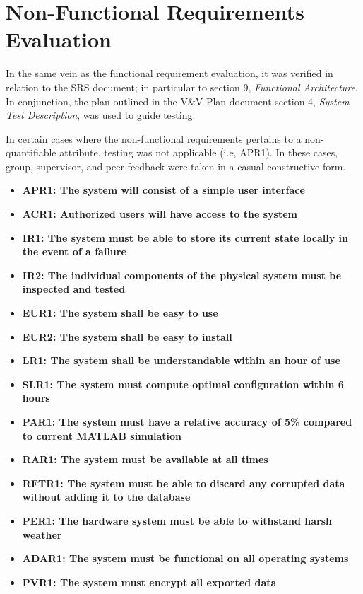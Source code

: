 \documentclass[12pt, titlepage]{article}
\begin{document}
\section{Non-Functional Requirements Evaluation}
In the same vein as the functional requirement evaluation, it was verified in relation to the SRS document; in particular to section 9, \emph{Functional Architecture}. In conjunction, the plan outlined in the V\&V Plan document section 4, \emph{System Test Description}, was used to guide testing.
\par
In certain cases where the non-functional requirements pertains to a non-quantifiable attribute, testing was not applicable (i.e, APR1). In these cases, group, supervisor, and peer feedback were taken in a casual constructive form.

\begin{center}
    \begin{itemize}
        \item \textbf{APR1: The system will consist of a simple user interface}
        \item \textbf{ACR1: Authorized users will have access to the system}
        \item \textbf{IR1: The system must be able to store its current state locally in the event of a failure}
        \item \textbf{IR2: The individual components of the physical system must be inspected and tested}
        \item \textbf{EUR1: The system shall be easy to use}
        \item \textbf{EUR2: The system shall be easy to install}
        \item \textbf{LR1: The system shall be understandable within an hour of use}
        \item \textbf{SLR1: The system must compute optimal configuration within 6 hours}
        \item \textbf{PAR1: The system must have a relative accuracy of 5\% compared to current MATLAB simulation}
        \item \textbf{RAR1: The system must be available at all times}
        \item \textbf{RFTR1: The system must be able to discard any corrupted data without adding it to the database}
        \item \textbf{PER1: The hardware system must be able to withstand harsh weather}
        \item \textbf{ADAR1: The system must be functional on all operating systems}
        \item \textbf{PVR1: The system must encrypt all exported data}
    \end{itemize}
\end{center}
\end{document}
